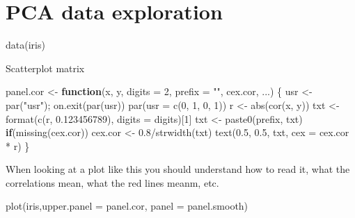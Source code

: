 \documentclass[
]{book}
\newenvironment{Shaded}{\begin{snugshade}}{\end{snugshade}}
\newcommand{\AttributeTok}[1]{\textcolor[rgb]{0.77,0.63,0.00}{#1}}
\newcommand{\ControlFlowTok}[1]{\textcolor[rgb]{0.13,0.29,0.53}{\textbf{#1}}}
\newcommand{\DecValTok}[1]{\textcolor[rgb]{0.00,0.00,0.81}{#1}}
\newcommand{\FloatTok}[1]{\textcolor[rgb]{0.00,0.00,0.81}{#1}}
\newcommand{\FunctionTok}[1]{\textcolor[rgb]{0.00,0.00,0.00}{#1}}
\newcommand{\NormalTok}[1]{#1}
\newcommand{\OtherTok}[1]{\textcolor[rgb]{0.56,0.35,0.01}{#1}}
\newcommand{\SpecialCharTok}[1]{\textcolor[rgb]{0.00,0.00,0.00}{#1}}
\newcommand{\StringTok}[1]{\textcolor[rgb]{0.31,0.60,0.02}{#1}}
\begin{document}
\hypertarget{pca-data-exploration}{%
\section{PCA data exploration}\label{pca-data-exploration}}

\begin{Shaded}
\begin{Highlighting}[]
\FunctionTok{data}\NormalTok{(iris)}
\end{Highlighting}
\end{Shaded}

Scatterplot matrix

\begin{Shaded}
\begin{Highlighting}[]
\NormalTok{panel.cor }\OtherTok{\textless{}{-}} \ControlFlowTok{function}\NormalTok{(x, y, }\AttributeTok{digits =} \DecValTok{2}\NormalTok{, }\AttributeTok{prefix =} \StringTok{""}\NormalTok{, cex.cor, ...)}
\NormalTok{\{}
\NormalTok{    usr }\OtherTok{\textless{}{-}} \FunctionTok{par}\NormalTok{(}\StringTok{"usr"}\NormalTok{); }\FunctionTok{on.exit}\NormalTok{(}\FunctionTok{par}\NormalTok{(usr))}
    \FunctionTok{par}\NormalTok{(}\AttributeTok{usr =} \FunctionTok{c}\NormalTok{(}\DecValTok{0}\NormalTok{, }\DecValTok{1}\NormalTok{, }\DecValTok{0}\NormalTok{, }\DecValTok{1}\NormalTok{))}
\NormalTok{    r }\OtherTok{\textless{}{-}} \FunctionTok{abs}\NormalTok{(}\FunctionTok{cor}\NormalTok{(x, y))}
\NormalTok{    txt }\OtherTok{\textless{}{-}} \FunctionTok{format}\NormalTok{(}\FunctionTok{c}\NormalTok{(r, }\FloatTok{0.123456789}\NormalTok{), }\AttributeTok{digits =}\NormalTok{ digits)[}\DecValTok{1}\NormalTok{]}
\NormalTok{    txt }\OtherTok{\textless{}{-}} \FunctionTok{paste0}\NormalTok{(prefix, txt)}
    \ControlFlowTok{if}\NormalTok{(}\FunctionTok{missing}\NormalTok{(cex.cor)) cex.cor }\OtherTok{\textless{}{-}} \FloatTok{0.8}\SpecialCharTok{/}\FunctionTok{strwidth}\NormalTok{(txt)}
    \FunctionTok{text}\NormalTok{(}\FloatTok{0.5}\NormalTok{, }\FloatTok{0.5}\NormalTok{, txt, }\AttributeTok{cex =}\NormalTok{ cex.cor }\SpecialCharTok{*}\NormalTok{ r)}
\NormalTok{\}}
\end{Highlighting}
\end{Shaded}

When looking at a plot like this you should understand how to read it, what the correlations mean, what the red lines meanm, etc.

\begin{Shaded}
\begin{Highlighting}[]
\FunctionTok{plot}\NormalTok{(iris,}\AttributeTok{upper.panel =}\NormalTok{ panel.cor,}
     \AttributeTok{panel =}\NormalTok{ panel.smooth)}
\end{Highlighting}
\end{Shaded}
\end{document}
